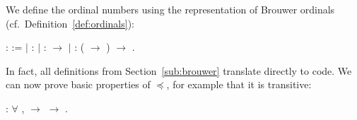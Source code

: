 We define the ordinal numbers using the representation of Brouwer
ordinals (cf.~Definition~\ref{def:ordinals}):
\begin{singlespace}
\begin{coqdoccode}
\coqdocnoindent
{}  :
 :=\coqdoceol
\coqdocindent{1.00em}
\ensuremath{|}   :
\coqdoceol
\coqdocindent{1.00em}
\ensuremath{|}   :
 \ensuremath{\rightarrow}
\coqdoceol
\coqdocindent{1.00em}
\ensuremath{|}  :
(
\ensuremath{\rightarrow} )
\ensuremath{\rightarrow}
.\coqdoceol
\end{coqdoccode}
\end{singlespace}
In fact, all definitions from Section~\ref{sub:brouwer} translate directly to
\Coq code. We can now prove basic properties of $\preceq$, for example that it
is transitive:
\begin{singlespace}
\begin{coqdoccode}
\coqdocnoindent
{}
:
\ensuremath{\forall} \coqdocvar{\ensuremath{\alpha}}
\coqdocvar{\ensuremath{\beta}}
\coqdocvar{\ensuremath{\gamma}}, \coqdocvariable{\ensuremath{\alpha}}
\coqdocinductive{\ensuremath{\preceq}} \coqdocvariable{\ensuremath{\beta}}
\ensuremath{\rightarrow}
\coqdocvariable{\ensuremath{\beta}} \coqdocinductive{\ensuremath{\preceq}}
\coqdocvariable{\ensuremath{\gamma}}
\ensuremath{\rightarrow} \coqdocvariable{\ensuremath{\alpha}}
\coqdocinductive{\ensuremath{\preceq}}
\coqdocvariable{\ensuremath{\gamma}}.\coqdoceol
\end{coqdoccode}
\end{singlespace}

